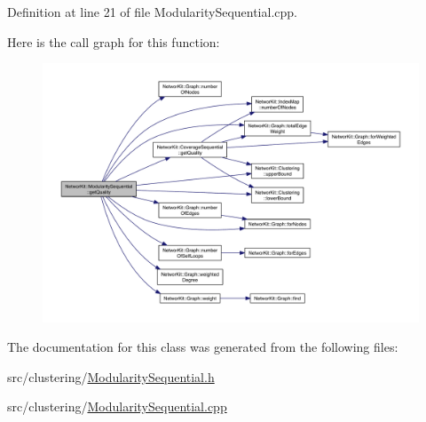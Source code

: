 Definition at line 21 of file Modularity\-Sequential.\-cpp.



Here is the call graph for this function\-:\nopagebreak
\begin{figure}[H]
\begin{center}
\leavevmode
\includegraphics[width=350pt]{class_networ_kit_1_1_modularity_sequential_ab26fba5ad431a5c7e930b6faeca13733_cgraph}
\end{center}
\end{figure}




The documentation for this class was generated from the following files\-:\begin{DoxyCompactItemize}
\item 
src/clustering/\hyperlink{_modularity_sequential_8h}{Modularity\-Sequential.\-h}\item 
src/clustering/\hyperlink{_modularity_sequential_8cpp}{Modularity\-Sequential.\-cpp}\end{DoxyCompactItemize}
